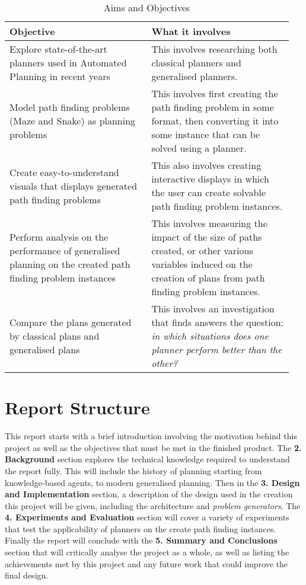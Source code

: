 \begin{table}[ht]
\centering
\begin{tabular}{|p{0.473\linewidth}|p{0.473\linewidth}|}
\hline
Objective & What it involves \\\hline
Explore state-of-the-art planners used in Automated Planning in recent years & This involves researching both classical planners and generalised planners. \\\hline
Model path finding problems (Maze and Snake) as planning problems & This involves first creating the path finding problem in some format, then converting it into some instance that can be solved using a planner.
\\\hline
Create easy-to-understand visuals that displays generated path finding problems & This also involves creating interactive displays in which the user can create solvable path finding problem instances. \\\hline
Perform analysis on the performance of generalised planning on the created path finding problem instances & This involves measuring the impact of the size of paths created, or other various variables induced on the creation of plans from path finding problem instances.
\\\hline
Compare the plans generated by classical plans and generalised plans & This involves an investigation that finds answers the question: \textit{in which situations does one planner perform better than the other?}
\\\hline
\end{tabular}
\caption{Aims and Objectives}
\end{table}

\section{Report Structure}
This report starts with a brief introduction involving the motivation behind this project as well as the objectives that must be met in the finished product. The \textbf{2. Background} section explores the technical knowledge required to understand the report fully. This will include the history of planning starting from knowledge-based agents, to modern generalised planning. Then in the \textbf{3. Design and Implementation} section, a description of the design used in the creation this project will be given, including the architecture and \textit{problem generators}. The \textbf{4. Experiments and Evaluation} section will cover a variety of experiments that test the applicability of planners on the create path finding instances. Finally the report will conclude with the \textbf{5. Summary and Conclusions} section that will critically analyse the project as a whole, as well as listing the achievements met by this project and any future work that could improve the final design.